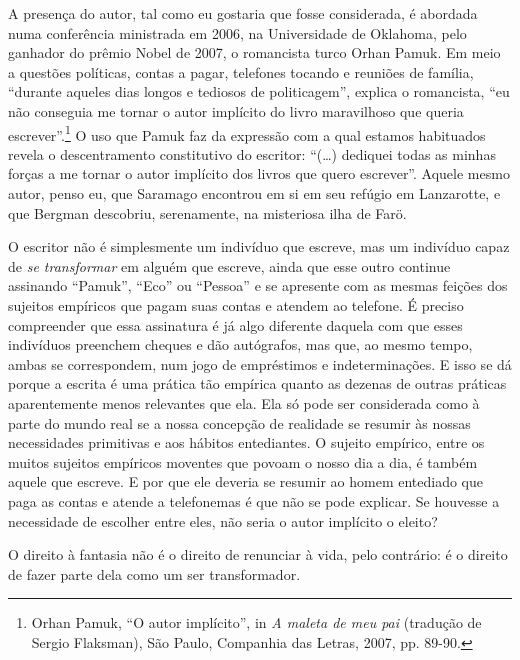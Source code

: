 A presença do autor, tal como eu gostaria que fosse considerada, é
abordada numa conferência ministrada em 2006, na Universidade de
Oklahoma, pelo ganhador do prêmio Nobel de 2007, o romancista turco
Orhan Pamuk. Em meio a questões políticas, contas a pagar, telefones
tocando e reuniões de família, ``durante aqueles dias longos e tediosos
de politicagem'', explica o romancista, ``eu não conseguia me tornar o
autor implícito do livro maravilhoso que queria escrever''.\footnote{Orhan
  Pamuk, ``O autor implícito'', in \emph{A maleta de meu pai} (tradução
  de Sergio Flaksman), São Paulo, Companhia das Letras, 2007, pp. 89-90.}
O uso que Pamuk faz da expressão com a qual estamos habituados revela o
descentramento constitutivo do escritor: ``(\ldots{}) dediquei todas as
minhas forças a me tornar o autor implícito dos livros que quero
escrever''. Aquele mesmo autor, penso eu, que Saramago encontrou em si
em seu refúgio em Lanzarotte, e que Bergman descobriu, serenamente, na
misteriosa ilha de Farö.

O escritor não é simplesmente um indivíduo que escreve, mas um indivíduo
capaz de \emph{se transformar} em alguém que escreve, ainda que
esse outro continue assinando ``Pamuk'', ``Eco'' ou ``Pessoa'' e se apresente com as mesmas feições dos sujeitos empíricos que pagam suas contas e atendem ao
telefone. É preciso compreender que essa assinatura é já algo diferente
daquela com que esses indivíduos preenchem cheques e dão autógrafos, mas
que, ao mesmo tempo, ambas se correspondem, num jogo de empréstimos e
indeterminações. E isso se dá porque a escrita é uma prática tão
empírica quanto as dezenas de outras práticas aparentemente menos
relevantes que ela. Ela só pode ser considerada como à parte do mundo
real se a nossa concepção de realidade se resumir às nossas
necessidades primitivas e aos hábitos entediantes. O sujeito empírico,
entre os muitos sujeitos empíricos moventes que povoam o nosso dia a
dia, é também aquele que escreve. E por que ele deveria se resumir ao
homem entediado que paga as contas e atende a telefonemas é que não se
pode explicar. Se houvesse a necessidade de escolher entre eles, não
seria o autor implícito o eleito?

O direito à fantasia não é o direito de renunciar à vida, pelo
contrário: é o direito de fazer parte dela como um ser transformador.

